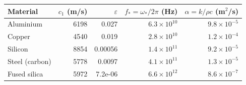 \begin{tabular}{@{}lrrrr@{}}\toprule
Material & $c_1$ (m/s) & $\varepsilon$ & $f_*=\omega_*/2\pi$ (Hz) & $\alpha=k/\rho c$ (m$^2$/s)\\\midrule
Aluminium & 6198 & 0.027 & $6.3\times10^{10}$ & $9.8\times10^{-5}$\\
Copper & 4540 & 0.019 & $2.8\times10^{10}$ & $1.2\times10^{-4}$\\
Silicon & 8854 & 0.00056 & $1.4\times10^{11}$ & $9.2\times10^{-5}$\\
Steel (carbon) & 5778 & 0.0097 & $4.1\times10^{11}$ & $1.3\times10^{-5}$\\
Fused silica & 5972 & 7.2e-06 & $6.6\times10^{12}$ & $8.6\times10^{-7}$\\
\bottomrule\end{tabular}